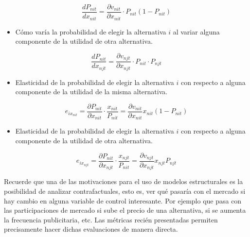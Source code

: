\documentclass[
]{book}
\providecommand{\tightlist}{%
  \setlength{\itemsep}{0pt}\setlength{\parskip}{0pt}}
\begin{document}
\begin{equation}
\frac{dP_{nit}}{dx_{nit}}  = \frac{\partial v_{nit}}{\partial x_{nit}} \cdot P_{nit}(1- P_{nit})
\label{eq:ownderivative}
\end{equation}

\begin{itemize}
\tightlist
\item
  Cómo varía la probabilidad de elegir la alternativa \(i\) al variar alguna componente de la utilidad de otra alternativa.
\end{itemize}

\begin{equation}
\frac{dP_{nit}}{dx_{njt}}  = \frac{\partial v_{njt}}{\partial x_{njt}} \cdot P_{nit}\cdot P_{njt}
\label{eq:crossderivative}
\end{equation}

\begin{itemize}
\tightlist
\item
  Elasticidad de la probabilidad de elegir la alternativa \(i\) con respecto a alguna componente de la utilidad de la misma alternativa.
\end{itemize}

\begin{equation}
e_{ix_{nit}} = \frac{\partial P_{nit}}{\partial x_{nit}}  \cdot \frac{x_{nit}}{P_{nit}}= \frac{\partial v_{nit}}{\partial x_{nit}} x_{nit} (1- P_{nit})
\label{eq:ownelasticity}
\end{equation}

\begin{itemize}
\tightlist
\item
  Elasticidad de la probabilidad de elegir la alternativa \(i\) con respecto a alguna componente de la utilidad de otra alternativa.
\end{itemize}

\begin{equation}
e_{ix_{njt}} = \frac{\partial P_{nit}}{\partial x_{njt}}  \cdot \frac{x_{njt}}{P_{nit}}= \frac{\partial v_{njt}}{\partial x_{njt}} x_{njt} P_{njt}
\label{eq:crosselasticity}
\end{equation}

Recuerde que una de las motivaciones para el uso de modelos estructurales es la posibilidad de analizar contrafactuales, esto es, ver qué pasaría con el mercado si hay cambio en alguna variable de control interesante. Por ejemplo que pasa con las participaciones de mercado si sube el precio de una alternativa, si se aumenta la frecuencia publicitaria, etc. Las métricas recién presentadas permiten precisamente hacer dichas evaluaciones de manera directa.
\end{document}
